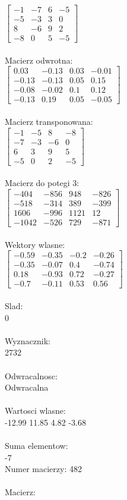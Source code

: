 \documentclass[a4paper,12pt]{article}
\begin{document}
$\begin{bmatrix} -1&-7&6&-5\\-5&-3&3&0\\8&-6&9&2\\-8&0&5&-5 \end{bmatrix}$
\\
\\
Macierz odwrotna:\\

$\begin{bmatrix} 0.03&-0.13&0.03&-0.01\\-0.13&-0.13&0.05&0.15\\-0.08&-0.02&0.1&0.12\\-0.13&0.19&0.05&-0.05 \end{bmatrix}$
\\
\\
Macierz transponowana:\\

$\begin{bmatrix} -1&-5&8&-8\\-7&-3&-6&0\\6&3&9&5\\-5&0&2&-5 \end{bmatrix}$
\\
\\
Macierz do potegi 3:\\

$\begin{bmatrix} -404&-856&948&-826\\-518&-314&389&-399\\1606&-996&1121&12\\-1042&-526&729&-871 \end{bmatrix}$
\\
\\
Wektory wlasne:\\

$\begin{bmatrix} -0.59&-0.35&-0.2&-0.26\\-0.35&-0.07&0.4&-0.74\\0.18&-0.93&0.72&-0.27\\-0.7&-0.11&0.53&0.56 \end{bmatrix}$
\\
\\
Slad:\\
0
\\
\\
Wyznacznik:\\
2732
\\
\\
Odwracalnosc:\\
Odwracalna
\\
\\
Wartosci wlasne:\\
-12.99 11.85 4.82 -3.68
\\
\\
Suma elementow:\\
-7
\\
\newpage
Numer macierzy:
482
\\
\\
Macierz:\\
\end{document}

